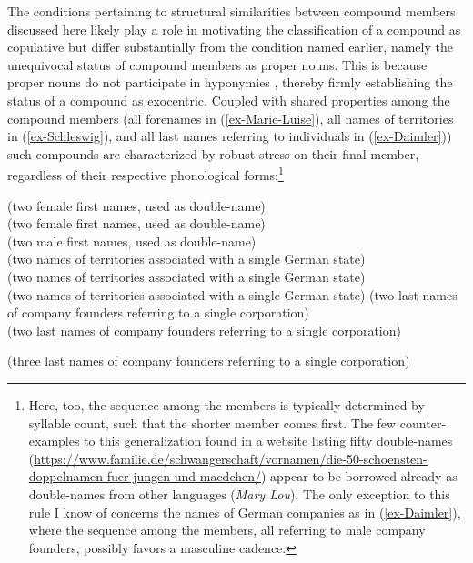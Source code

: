 \documentclass[output=paper
 ,nobabel
 ,draftmode
 ,colorlinks, citecolor=brown
]{langscibook}
\begin{document}
The conditions pertaining to structural similarities between compound members discussed here likely play a role in motivating the classification of a compound as copulative but differ substantially from the condition named earlier, namely the unequivocal status of compound members as proper nouns. This is because proper nouns do not participate in hyponymies , thereby firmly establishing the status of a compound as exocentric. Coupled with shared properties among the compound members (\eg all forenames in (\ref{ex-Marie-Luise}), all names of territories in (\ref{ex-Schleswig}), and all last names referring to individuals in (\ref{ex-Daimler})) such compounds 
are characterized by robust stress on their final member, regardless of their respective phonological forms:\footnote{Here, too, the sequence among the members is typically determined by syllable count, such that the shorter member comes first. The few counter-examples to this generalization found in a website listing fifty double-names  (\url{https://www.familie.de/schwangerschaft/vornamen/die-50-schoensten-doppelnamen-fuer-jungen-und-maedchen/}) appear to be borrowed already as double-names from other languages (\eg \emph{Mary Lou}). The only exception to this rule I know of concerns the names of German companies as in (\ref{ex-Daimler}), where the sequence among the members, all referring to male company founders, possibly favors a masculine cadence.} 

\eal\label{ex-Marie-Klöckner}
\ex\label{ex-Marie-Luise}
 (two female first names, used as double-name) \\ 
 (two female first names, used as double-name) \\ 
 (two male first names, used as double-name) \\
\ex\label{ex-Schleswig}
 (two names of territories associated with a single German state) \\ 
 (two names of territories associated with a single German state)\\
 (two names of territories associated with a single German state)
\ex\label{ex-Daimler}
 (two last names of company founders referring to a single corporation) \\
 (two last names of company founders referring to a single corporation)

 (three last names of company founders referring to a single corporation)
\\
\end{document}
